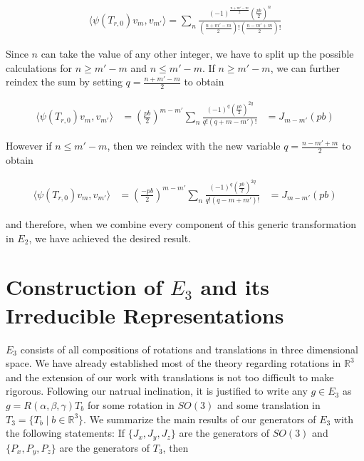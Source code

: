 \documentclass[10pt]{ucthesis}
\newcommand{\R}{\mathbb{R}}
\begin{document}
\begin{equation}
\begin{aligned}
 \langle \psi(T_{r,0})v_m , v_{m'} \rangle = \sum_n \frac{(-1)^\frac{n+m'-m}{2}(\frac{pb}{2})^n}{(\frac{n+m'-m}{2})!(\frac{n-m'+m}{2})!}
\end{aligned}
\end{equation}

Since $n$ can take the value of any other integer, we have to split up the possible calculations for $n\geq m'-m$ and $n\leq m'-m$. If $n\geq m'-m$, we can further reindex the sum by setting $q=\frac{n+m'-m}{2}$ to obtain

\begin{equation}
\begin{aligned}
 \langle \psi(T_{r,0})v_m , v_{m'} \rangle &= \left(\frac{pb}{2}\right)^{m-m'}\sum_n \frac{(-1)^q(\frac{pb}{2})^{2q}}{q!(q+m-m')!} &= J_{m-m'}(pb)
\end{aligned}
\end{equation}

However if $n\leq m'-m$, then we reindex with the new variable $q =\frac{n-m'+m}{2}$ to obtain 

\begin{equation}
\begin{aligned}
 \langle \psi(T_{r,0})v_m , v_{m'} \rangle &= \left(\frac{-pb}{2}\right)^{m-m'}\sum_n \frac{(-1)^q(\frac{pb}{2})^{2q}}{q!(q-m+m')!} &= J_{m-m'}(pb)
\end{aligned}
\end{equation}

and therefore, when we combine every component of this generic transformation in $E_2$, we have achieved the desired result. \qedsymbol

\section{Construction of $E_3$ and its Irreducible Representations}

$E_3$ consists of all compositions of rotations and translations in three dimensional space. We have already established most of the theory regarding rotations in $\R^3$ and the extension of our work with translations is not too difficult to make rigorous. Following our natrual inclination, it is justified to write any $g\in E_3$ as  $g = R(\alpha,\beta,\gamma)T_b$ for some rotation in $SO(3)$ and some translation in $T_3 = \{T_b \mid b\in\R^3\}$. We summarize the main results of our generators of $E_3$ with the following statements: If $\{J_x,J_y,J_z\}$ are the generators of $SO(3)$ and $\{P_x,P_y,P_z\}$ are the generators of $T_3$, then
\end{document}
